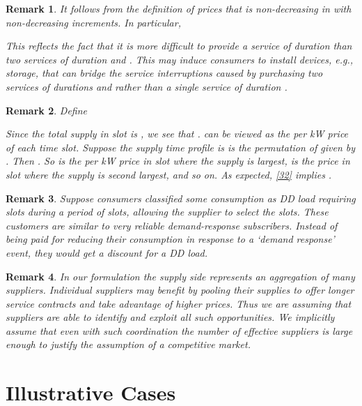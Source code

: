 \documentclass[10pt,draftcls,onecolumn]{IEEEtran}
\newtheorem{remark}{Remark}
\newcounter{l1}
\newcounter{l2}
\newcounter{l3}
\begin{document}
\begin{remark}
It follows from the definition of prices  that  is non-decreasing in  with non-decreasing increments. In particular,

 This reflects the fact that it is more difficult to provide  a service of duration  than
two services of duration  and .    This may induce consumers 
 to install devices, e.g., storage, that can bridge the service interruptions caused by purchasing two services of durations  and  rather than a single service of duration .
\end{remark}

\begin{remark}
\label{remarkslot}
Define 

Since the total supply in slot  is , we see that .   can be viewed as the per kW price  of each time slot. Suppose the supply time profile is  is the permutation of  given by .  Then .  So  is the per kW price in slot  where the supply is largest,  is the price in slot  where the supply is second largest, and so on.  As expected, \eqref{32} implies .
\end{remark}

\begin{remark}
Suppose consumers classified some consumption as DD load  requiring  slots during a  period of  slots, allowing the supplier to
select the  slots.  These customers are similar to very reliable demand-response subscribers.  Instead of being paid for reducing their consumption in response to a `demand response' event, they would get a discount for a DD load.
\end{remark}
\begin{remark}{ In our formulation the supply side represents an aggregation of many suppliers.  Individual suppliers may benefit by pooling their supplies to offer longer service contracts and take advantage of higher prices.  Thus we are assuming that  suppliers are able to identify and exploit all such opportunities.  We implicitly assume that even with such coordination the number of effective suppliers is large enough to justify the assumption of a competitive market. }
\end{remark}









\section{Illustrative Cases} \label{sec-illustra}
\end{document}
